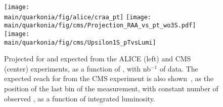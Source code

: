 \documentclass[../report.tex]{subfiles}
\providecommand{\main}{..}
\begin{document}
% 

\begin{figure}
\begin{center}
 \texttt{[image: \\main/quarkonia/fig/alice/craa\_pt]}
 \texttt{[image: \\main/quarkonia/fig/cms/Projection\_RAA\_vs\_pt\_wo3S.pdf]}
 \texttt{[image: \\main/quarkonia/fig/cms/Upsilon1S\_pTvsLumi]}
\end{center}

 \caption{Projected \raa for  and  expected from the ALICE (left) and CMS~\cite{CMS-PAS-FTR-18-024} (center) experiments, as a function of \pt, with \unit[10]{nb}$^{-1}$ of \PbPb data. The expected \pt reach for  from the CMS experiment is
 also shown~\cite{CMS-PAS-FTR-18-024}, as the position of the last \pt bin of the measurement, with constant number of observed , as a function of integrated luminosity.
 }
 \label{fig:upsi_raa_pt}
\end{figure}
\end{document}
